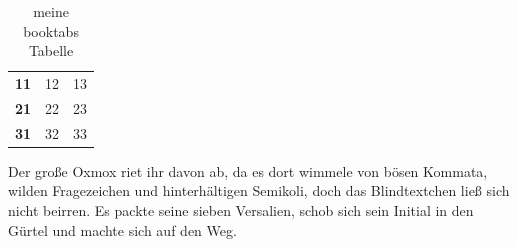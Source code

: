 \documentclass[%
	12pt,%
	a4paper,%
	oneside,%
	listof=totoc,
 	index=totoc,
	bibliography = totoc,
	parskip = half,%
	chapterprefix=false,%
	appendixprefix, %
headings=small,%
]{scrreprt}
\newcommand{\thead}[1]{\textbf{#1}}
\begin{document}
\begin{table}[htbp]
	\centering
		\begin{tabular}{l l l}
			\thead{11} & 12 & 13 \\ %
			\thead{21} & 22 & 23 \\
			\thead{31} & 32 & 33
		\end{tabular}
	\caption{meine booktabs Tabelle}
	\label{tab:meinebooktabsTabelle}
\end{table}


Der große Oxmox riet ihr davon ab, da es dort wimmele von bösen Kommata, wilden Fragezeichen und hinterhältigen Semikoli, doch das Blindtextchen ließ sich nicht beirren. Es packte seine sieben Versalien, schob sich sein Initial in den Gürtel und machte sich auf den Weg. 


\end{document}
